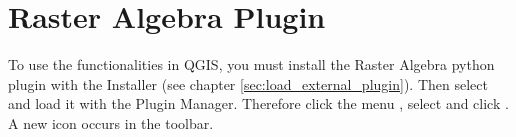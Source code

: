 
\section{Raster Algebra Plugin}\label{sec:raster_algebra}

\updatedisclaimer


To use the functionalities in QGIS, you must install the Raster Algebra 
python plugin with the  Installer 
(see chapter \ref{sec:load_external_plugin}). Then select and load it 
with the Plugin Manager. Therefore click the menu  
\arrow {}, select  
and click . A new  
icon occurs in the toolbar.

